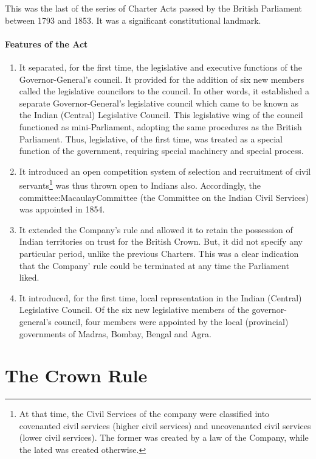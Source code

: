 This was the last of the series of Charter Acts passed by the British Parliament between 1793 and 1853. It was a significant constitutional landmark.
\paragraph{Features of the Act}

\begin{enumerate}
  \item It separated, for the first time, the legislative and executive functions of the Governor-General's council. It provided for the addition of six new members called the legislative councilors to the council. In other words, it established a separate Governor-General's legislative council which came to be known as the Indian (Central) Legislative Council. This legislative wing of the council functioned as mini-Parliament, adopting the same procedures as the British Parliament. Thus, legislative, of the first time, was treated as a special function of the government, requiring special machinery and special process.
  \item It introduced an open competition system of selection and recruitment of civil servants\footnote{At that time, the Civil Services of the company were classified into covenanted civil services (higher civil services) and uncovenanted civil services (lower civil services). The former was created by a law of the Company, while the lated was created otherwise.} was thus thrown open to Indians also. Accordingly, the \gls{committee:MacaulayCommittee} (the Committee on the Indian Civil Services) was appointed in 1854.
  \item It extended the Company's rule and allowed it to retain the possession of Indian territories on trust for the British Crown. But, it did not specify any particular period, unlike the previous Charters. This was a clear indication that the Company' rule could be terminated at any time the Parliament liked.
  \item It introduced, for the first time, local representation in the Indian (Central) Legislative Council. Of the six new legislative members of the governor-general's council, four members were appointed by the local (provincial) governments of Madras, Bombay, Bengal and Agra.
\end{enumerate}

\section{The Crown Rule}

